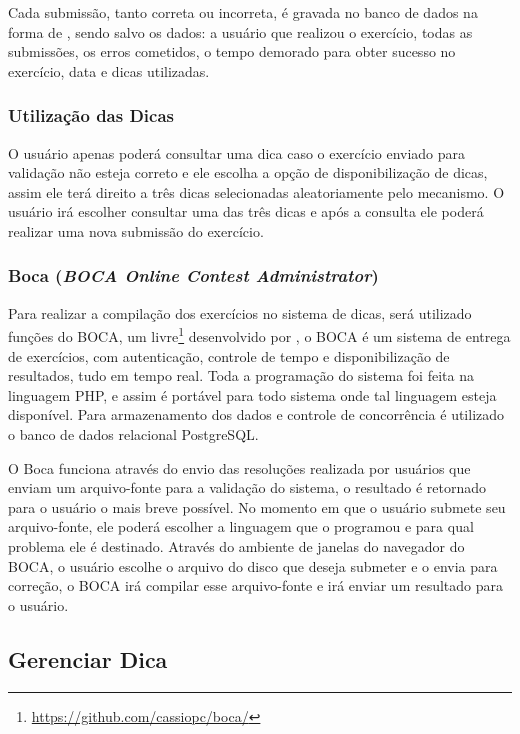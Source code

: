 Cada submissão, tanto correta ou incorreta, é gravada no banco de dados na forma de , sendo salvo os dados: a usuário que realizou o exercício, todas as submissões, os erros cometidos, o tempo demorado para obter sucesso no exercício, data e dicas utilizadas.

\subsubsection{Utilização das Dicas}

O usuário apenas poderá consultar uma dica caso o exercício enviado para validação não esteja correto e ele escolha a opção de disponibilização de dicas, assim ele terá direito a três dicas selecionadas aleatoriamente pelo mecanismo. O usuário irá escolher consultar uma das três dicas e após a consulta ele poderá realizar uma nova submissão do exercício.

\subsubsection{Boca (\textit{BOCA Online Contest Administrator})}

Para realizar a compilação dos exercícios no sistema de dicas, será utilizado funções do BOCA, um  livre\footnote{\url{https://github.com/cassiopc/boca/}} desenvolvido por , o BOCA é um sistema de entrega de exercícios, com autenticação, controle de tempo e disponibilização de resultados, tudo em tempo real. Toda a programação do sistema foi feita na linguagem PHP, e assim é portável para todo sistema onde tal linguagem esteja disponível. Para armazenamento dos dados e controle de concorrência é utilizado o banco de dados relacional PostgreSQL. 

O Boca funciona através do envio das resoluções realizada por usuários que enviam um arquivo-fonte para a validação do sistema, o resultado é retornado para o usuário o mais breve possível. No momento em que o usuário submete seu arquivo-fonte, ele poderá escolher a linguagem que o programou e para qual problema ele é destinado. Através do ambiente de janelas do navegador do BOCA, o usuário escolhe o arquivo do disco que deseja submeter e o envia para correção, o BOCA irá compilar esse arquivo-fonte e irá enviar um resultado para o usuário.

\subsection{Gerenciar Dica}

